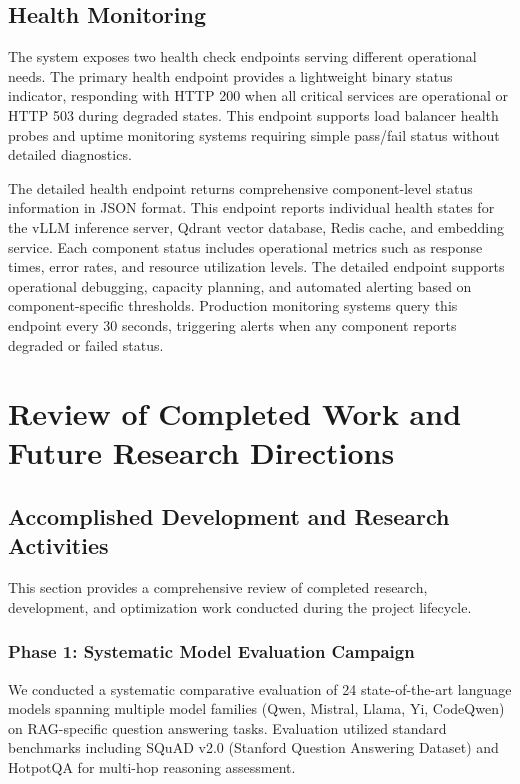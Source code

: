 \documentclass[12pt,a4paper]{article}
\begin{document}
\subsection{Health Monitoring}

The system exposes two health check endpoints serving different operational needs. The primary health endpoint provides a lightweight binary status indicator, responding with HTTP 200 when all critical services are operational or HTTP 503 during degraded states. This endpoint supports load balancer health probes and uptime monitoring systems requiring simple pass/fail status without detailed diagnostics.

The detailed health endpoint returns comprehensive component-level status information in JSON format. This endpoint reports individual health states for the vLLM inference server, Qdrant vector database, Redis cache, and embedding service. Each component status includes operational metrics such as response times, error rates, and resource utilization levels. The detailed endpoint supports operational debugging, capacity planning, and automated alerting based on component-specific thresholds. Production monitoring systems query this endpoint every 30 seconds, triggering alerts when any component reports degraded or failed status.

\section{Review of Completed Work and Future Research Directions}

\subsection{Accomplished Development and Research Activities}

This section provides a comprehensive review of completed research, development, and optimization work conducted during the project lifecycle.

\subsubsection{Phase 1: Systematic Model Evaluation Campaign}

We conducted a systematic comparative evaluation of 24 state-of-the-art language models spanning multiple model families (Qwen, Mistral, Llama, Yi, CodeQwen) on RAG-specific question answering tasks. Evaluation utilized standard benchmarks including SQuAD v2.0 (Stanford Question Answering Dataset) and HotpotQA for multi-hop reasoning assessment.
\end{document}
